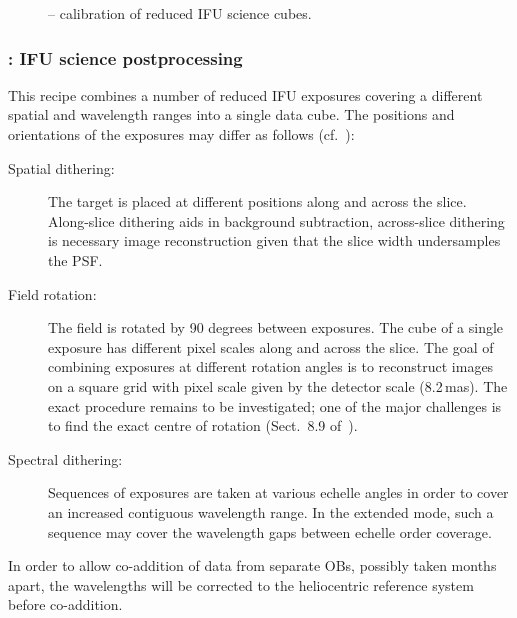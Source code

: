 \begin{figure}[hb]
  \centering
    \def \globalscale {0.700000}
    \fontsize{10}{12}\selectfont
    
  \caption[Recipe: ]{
    -- calibration of reduced IFU science cubes.}
  \label{fig:metis_ifu_calibrate}
\end{figure}


\clearpage
\subsubsection{: IFU science postprocessing}
\label{sssec:ifu_sci_postprocess}\label{sssec:ifu_postprocess}
\label{rec:metis_ifu_postprocess}

This recipe combines a number of reduced IFU exposures covering a
different spatial and wavelength ranges into a single data cube. The
positions and orientations of the exposures may differ as follows (cf.~\cite{METIS-operational_concept}): %
\begin{description}
\item[Spatial dithering:] The target is placed at different positions
  along and across the slice. Along-slice dithering aids in background
  subtraction, across-slice dithering is necessary image
  reconstruction given that the slice width undersamples the PSF\@.
\item[Field rotation:] The field is rotated by 90 degrees between
  exposures. The cube of a single exposure has different pixel scales
  along and across the slice. The goal of combining exposures at
  different rotation angles is to reconstruct images on a square grid
  with pixel scale given by the detector scale (8.2\,mas). The exact
  procedure remains to be investigated; one of the major challenges is
  to find the exact centre of rotation
  (Sect.~8.9 of~\cite{DRLS}).
\item[Spectral dithering:] Sequences of exposures are taken at various
  echelle angles in order to cover an increased contiguous wavelength
  range. In the extended mode, such a sequence may cover the
  wavelength gaps between echelle order coverage.
\end{description}

In order to allow co-addition of data from separate OBs, possibly taken
months apart, the wavelengths will be corrected to the heliocentric
reference system before co-addition.

